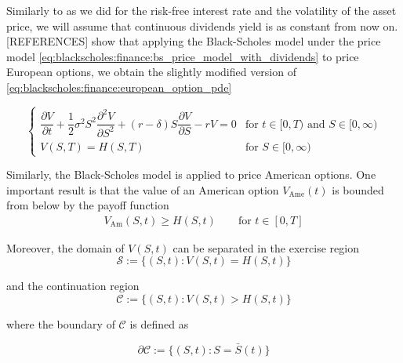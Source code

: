 Similarly to
as we did for the risk-free interest rate and the volatility of the asset price,
we will assume that continuous dividends yield is as constant from now on. [REFERENCES]
show that applying the Black-Scholes model under the price model \eqref{eq:blackscholes:finance:bs_price_model_with_dividends} to price European options,
we obtain the slightly modified version of \eqref{eq:blackscholes:finance:european_option_pde}

\begin{equation}
  \begin{cases}
    \dfrac{\partial{V}}{\partial{t}} + \dfrac{1}{2}\sigma^{2} S^2 \dfrac{\partial^2{V}}{\partial{S^2}} + (r - \delta) S \dfrac{\partial{V}}{\partial{S}} - rV = 0 & \text{for $t\in[0,T)$ and $S\in[0, \infty)$} \\
    V(S, T) = H(S, T) & \text{for $S\in[0, \infty)$}
  \end{cases}
  \label{eq:chapter2:european_option_pde_with_dividens}
\end{equation}
 
Similarly, the Black-Scholes model is applied to price American options. 
One important result is that the value of an American option $V_\text{Ame}(t)$ is
bounded from below by the payoff function
\begin{align}
  V_{\text{Am}}(S, t) \ge H(S, t) \qquad \text{for $t\in[0,T]$}
  \label{eq:blackscholes:american_options_price_lower_bound}
\end{align}

Moreover, the domain of $V(S,t)$ can be separated in the exercise region 
\begin{equation}
  \mathcal{S} := \{(S, t): V(S, t) = H(S, t) \}
\end{equation}

and the continuation region 
\begin{equation}
  \mathcal{C} := \{(S, t): V(S, t) > H(S, t) \}
\end{equation}

where the boundary of $\mathcal{C}$ is defined as

\begin{equation}
  \partial \mathcal{C} := \{(S, t): S = \bar{S}(t)\} 
\end{equation}

